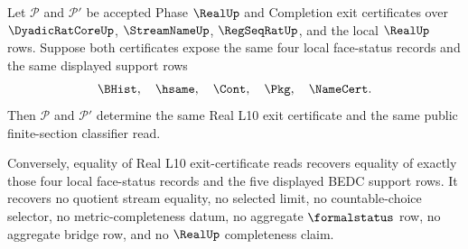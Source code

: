 \begin{theorem}
\label{thm:real-l10-exit-certificate-support-no-confusion}
Let $\mathcal P$ and $\mathcal P'$ be accepted Phase $\RealUp$ and Completion exit certificates over $\DyadicRatCoreUp$, $\StreamNameUp$, $\RegSeqRatUp$, and the local $\RealUp$ rows. Suppose both certificates expose the same four local face-status records and the same displayed support rows
$$
\BHist,\quad \hsame,\quad \Cont,\quad \Pkg,\quad \NameCert.
$$
Then $\mathcal P$ and $\mathcal P'$ determine the same Real L10 exit certificate and the same public finite-section classifier read.

Conversely, equality of Real L10 exit-certificate reads recovers equality of exactly those four local face-status records and the five displayed BEDC support rows. It recovers no quotient stream equality, no selected limit, no countable-choice selector, no metric-completeness datum, no aggregate $\formalstatus$ row, no aggregate bridge row, and no $\RealUp$ completeness claim.
\end{theorem}
